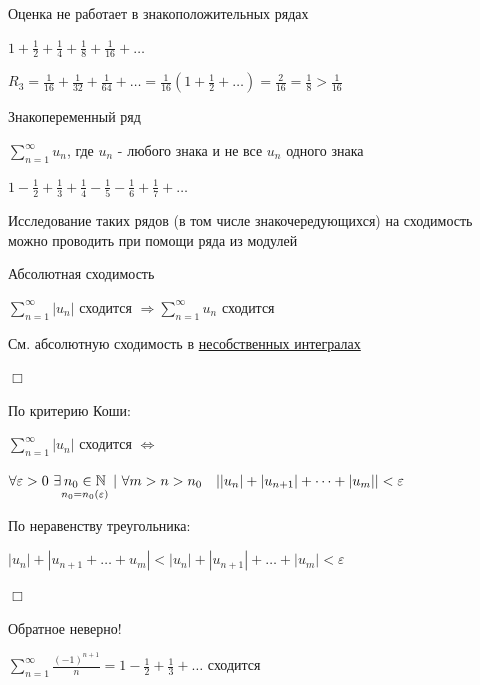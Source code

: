 \documentclass[12pt]{article}
\begin{document}
    \Nota Оценка не работает в знакоположительных рядах

    $1 + \frac{1}{2} + \frac{1}{4} + \frac{1}{8} + \frac{1}{16} + \dots$

    $R_3 = \frac{1}{16} + \frac{1}{32} + \frac{1}{64} + \dots = \frac{1}{16} \left(1 + \frac{1}{2} + \dots\right) = \frac{2}{16} = \frac{1}{8} > \frac{1}{16}$

    \hypertarget{changingsignseries}{}

    \Def Знакопеременный ряд

    $\sum_{n = 1}^\infty u_n$, где $u_n$ - любого знака и не все $u_n$ одного знака

    \Ex $1 - \frac{1}{2} + \frac{1}{3} + \frac{1}{4} - \frac{1}{5} - \frac{1}{6} + \frac{1}{7} + \dots$

    \Nota Исследование таких рядов (в том числе знакочередующихся) на сходимость можно проводить при помощи ряда из модулей

    \hypertarget{absoluteconvergence}{}

    \begin{MyTheorem}
        \Ths Абсолютная сходимость

        $\sum_{n = 1}^\infty |u_n|$ сходится $\Longrightarrow \sum_{n = 1}^\infty u_n$ сходится
    \end{MyTheorem}

    \Mems См. абсолютную сходимость в \href{https://pelmesh619.github.io/itmo_conspects/conspects/calculus/calculus_superconspect.pdf}{несобственных интегралах}

    \begin{MyProof}
        $\Box$

        По критерию Коши:

        $\sum_{n = 1}^\infty |u_n|$ сходится $\Longleftrightarrow$

        $\forall \varepsilon > 0 \ \exists \underset{n_0 = n_0(\varepsilon)}{n_0 \in \mathbb{N}} \ | \ \forall m > n > n_0 \quad ||u_n| + |u_{n + 1}| + \dots + |u_m|| < \varepsilon$

        По неравенству треугольника:

        $|u_n| + |u_{n + 1} + \dots + u_m| < |u_n| + |u_{n + 1}| + \dots + |u_m| < \varepsilon$

        $\Box$
    \end{MyProof}

    \Notas Обратное неверно!

    \Ex $\sum_{n = 1}^\infty \frac{(-1)^{n + 1}}{n} = 1 - \frac{1}{2} + \frac{1}{3} + \dots $ сходится
\end{document}
